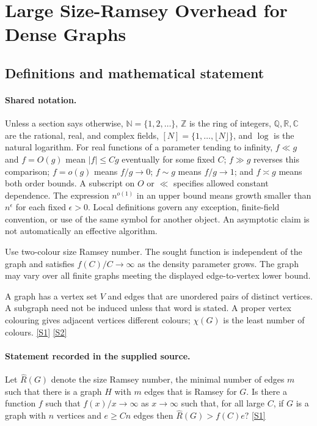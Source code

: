 \documentclass[11pt,a4paper]{article}
\newcommand{\N}{\mathbb{N}}
\newcommand{\Z}{\mathbb{Z}}
\newcommand{\Q}{\mathbb{Q}}
\newcommand{\R}{\mathbb{R}}
\newcommand{\C}{\mathbb{C}}
\newcommand{\sref}[2]{\hyperlink{source:#1:#2}{[S#2]}}
\begin{document}
\section{Large Size-Ramsey Overhead for Dense Graphs}\label{statement}


\subsection{Definitions and mathematical statement}

\paragraph{Shared notation.}Unless a section says otherwise, $\N=\{1,2,\ldots\}$,
$\Z$ is the ring of integers, $\Q,\R,\C$ are the rational, real, and complex
fields, $[N]=\{1,\ldots,\lfloor N\rfloor\}$, and $\log$ is the natural
logarithm. For real functions of a parameter tending to infinity,
$f\ll g$ and $f=O(g)$ mean $|f|\leq Cg$ eventually for some fixed $C$;
$f\gg g$ reverses this comparison; $f=o(g)$ means $f/g\to0$;
$f\sim g$ means $f/g\to1$; and $f\asymp g$ means both order bounds.
A subscript on $O$ or $\ll$ specifies allowed constant dependence.
The expression $n^{o(1)}$ in an upper bound means growth smaller than
$n^\epsilon$ for each fixed $\epsilon>0$. Local definitions govern any
exception, finite-field convention, or use of the same symbol for another
object. An asymptotic claim is not automatically an effective algorithm.



Use two-colour size Ramsey number. The sought function is independent of the graph and satisfies $f(C)/C\to\infty$ as the density parameter grows. The graph may vary over all finite graphs meeting the displayed edge-to-vertex lower bound.

A graph has a vertex set $V$ and edges that are unordered pairs of distinct vertices. A subgraph need not be induced unless that word is stated. A proper vertex colouring gives adjacent vertices different colours; $\chi(G)$ is the least number of colours. \sref{statement}{1} \sref{statement}{2}

\paragraph{Statement recorded in the supplied source.}
Let $\hat{R}(G)$ denote the size Ramsey number, the minimal number of edges $m$ such that there is a graph $H$ with $m$ edges that is Ramsey for $G$.
Is there a function $f$ such that $f(x)/x\to \infty$ as $x\to \infty$ such that, for all large $C$, if $G$ is a graph with $n$ vertices and $e\geq Cn$ edges then $ \hat{R}(G) > f(C) e? $ \sref{statement}{1}
\end{document}
